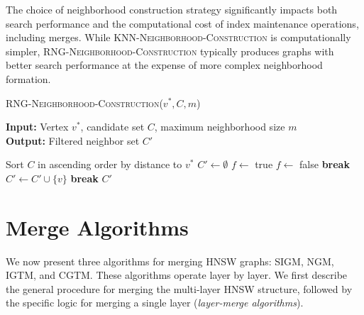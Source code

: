 \documentclass{article}
\begin{document}
The choice of neighborhood construction strategy significantly impacts both search performance and the computational cost of index maintenance operations, including merges. While \textsc{KNN-Neighborhood-Construction} is computationally simpler, \textsc{RNG-Neighborhood-Construction} typically produces graphs with better search performance at the expense of more complex neighborhood formation.

\begin{algorithm}
\caption{\textsc{RNG-Neighborhood-Construction}($v^*, C, m$)}\label{alg:rngstrategy}
\textbf{Input:} Vertex $v^*$, candidate set $C$, maximum neighborhood size $m$ \\
\textbf{Output:} Filtered neighbor set $C'$
\begin{algorithmic}[1]
\State Sort $C$ in ascending order by distance to $v^*$
\State $C' \gets \emptyset$
    \State $f \gets$ true
            \State $f \gets$ false
            \State \textbf{break}
        \EndIf
    \EndFor
        \State $C' \gets C' \cup \{v\}$
    \EndIf
        \State \textbf{break}
    \EndIf
\EndFor
\State \Return $C'$
\end{algorithmic}
\end{algorithm}

\section{Merge Algorithms}

We now present three algorithms for merging HNSW graphs: \textsc{SIGM},  \textsc{NGM}, \textsc{IGTM}, and \textsc{CGTM}. These algorithms operate layer by layer. We first describe the general procedure for merging the multi-layer HNSW structure, followed by the specific logic for merging a single layer (\textit{layer-merge algorithms}).
\end{document}

